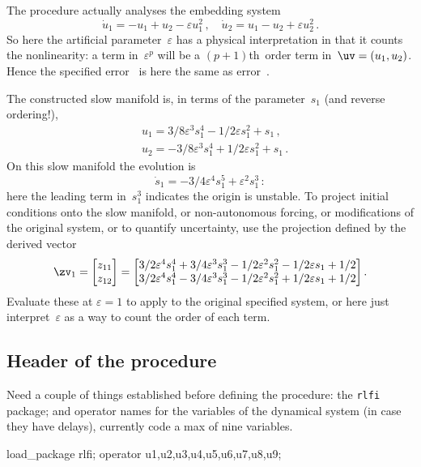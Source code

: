\documentclass[11pt,a5paper]{article}
\def\eps{\varepsilon}
\begin{document}
The procedure actually analyses the embedding system
\begin{equation*}
\dot u_1=-u_1+u_2-\eps u_1^2\,, \quad \dot u_2=u_1-u_2+\eps u_2^2\,.
\end{equation*}
So here the artificial parameter~\(\eps\) has a physical interpretation in that it counts the nonlinearity: a term in~\(\eps^p\) will be a \((p+1)\)th~order term in~\(\uv=(u_1,u_2)\).
Hence the specified error~\Ord{\eps^5} is here the same as error~.

The constructed slow manifold is, in terms of the parameter~\(s_1\) (and reverse ordering!), 
\begin{align*}&
u_{1}=3/8 \eps^{3} s_{1}^{4}-1/2 \eps s_{1}^{2}+s_{1}\,,
\\&
u_{2}=-3/8 \eps^{3} s_{1}^{4}+1/2 \eps s_{1}^{2}+s_{1}\,.
\end{align*}
On this slow manifold the evolution is
\begin{equation*}
\dot s_{1}=-3/4 \eps^{4} s_{1}^{5}+\eps^{2} s_{1}^{3}\,:
\end{equation*}
here the leading term in~\(s_1^3\) indicates the origin is unstable.
To project initial conditions
onto the slow manifold, or non-autonomous
forcing, or modifications of the original system, or to quantify uncertainty, use the projection defined by the derived vector
\begin{equation*}
\zv_1=\begin{bmatrix}z_{11}\\z_{12}\end{bmatrix}
=\begin{bmatrix}
3/2 \eps^{4} s_{1}^{4}+3/4 \eps^{3} s_{1}^{3}-1/2 \eps^{2} s_{1}
^{2}-1/2 \eps s_{1}+1/2
\\
3/2 \eps^{4} s_{1}^{4}-3/4 \eps^{3} s_{1}^{3}-1/2 \eps^{2} s_{1}
^{2}+1/2 \eps s_{1}+1/2
\end{bmatrix}.
\end{equation*}
Evaluate these at \(\eps=1\) to apply to the original specified system, or here just interpret~\(\eps\) as a way to count the order of each term.




\subsection{Header of the procedure}

Need a couple of things established before defining the procedure: the \verb|rlfi| package; and operator names for the variables of the dynamical system (in case they have delays), currently code a max of nine variables.
\begin{reduce}
load_package rlfi; 
operator u1,u2,u3,u4,u5,u6,u7,u8,u9;
\end{reduce}
\end{document}
